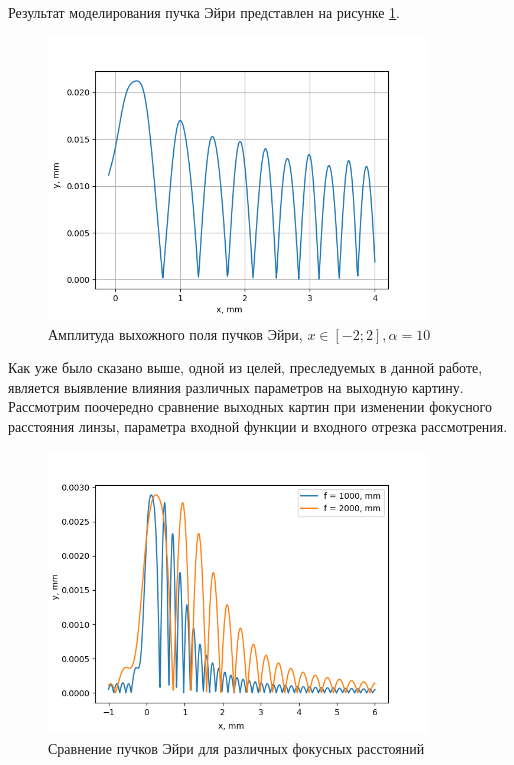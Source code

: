{Результат моделирования пучка Эйри представлен на рисунке \ref{airyoutput}.
  \begin{figure}[H]
		  \begin{center}
			\includegraphics[width=10cm]{plots/airyoutput}
	\caption{Амплитуда выхожного поля пучков Эйри, $x \in [-2; 2],  \alpha  = 10$}
	\label{airyoutput}
		 \end{center}
	
\end{figure}

Как уже было сказано выше, одной из целей, преследуемых в данной работе, является выявление влияния различных параметров на выходную картину. Рассмотрим поочередно сравнение выходных картин при изменении фокусного расстояния линзы, параметра входной функции и входного отрезка рассмотрения.

 \begin{figure}[H]
		  \begin{center}
			\includegraphics[width=10cm]{plots/ai_focus_comparison}
	\caption{Сравнение пучков Эйри для различных фокусных расстояний}
	\label{ai_focus_comparison}
		 \end{center}
\end{figure}

}

